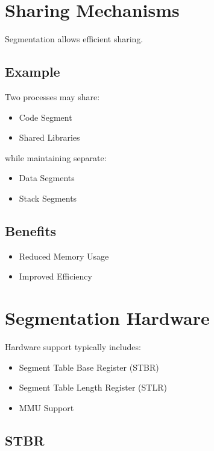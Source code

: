 \section{Sharing Mechanisms}

Segmentation allows efficient sharing.

\subsection{Example}

Two processes may share:

\begin{itemize}
\item Code Segment
\item Shared Libraries
\end{itemize}

while maintaining separate:

\begin{itemize}
\item Data Segments
\item Stack Segments
\end{itemize}

\subsection{Benefits}

\begin{itemize}
\item Reduced Memory Usage
\item Improved Efficiency
\end{itemize}

\section{Segmentation Hardware}

Hardware support typically includes:

\begin{itemize}
\item Segment Table Base Register (STBR)
\item Segment Table Length Register (STLR)
\item MMU Support
\end{itemize}

\subsection{STBR}

